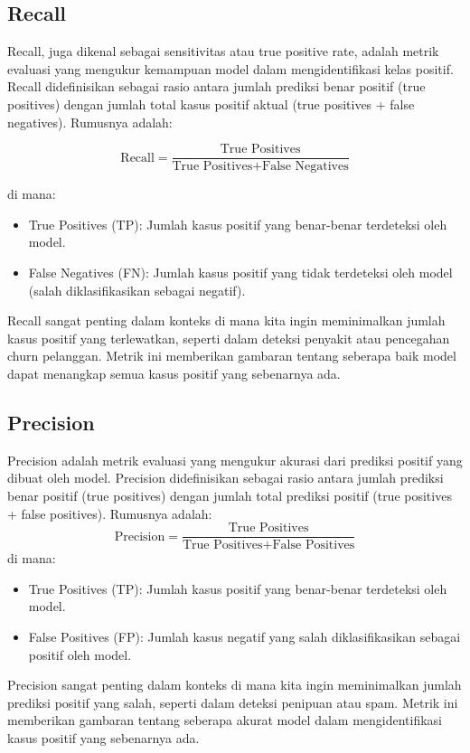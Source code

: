 \subsection{Recall}
Recall, juga dikenal sebagai sensitivitas atau true positive rate, adalah metrik evaluasi yang mengukur kemampuan model dalam mengidentifikasi kelas positif. Recall didefinisikan sebagai rasio antara jumlah prediksi benar positif (true positives) dengan jumlah total kasus positif aktual (true positives + false negatives). Rumusnya adalah:

\begin{equation}
    \text{Recall} = \frac{\text{True Positives}}{\text{True Positives} + \text{False Negatives}}
\end{equation}

di mana:
\begin{itemize}
    \item True Positives (TP): Jumlah kasus positif yang benar-benar terdeteksi oleh model.
    \item False Negatives (FN): Jumlah kasus positif yang tidak terdeteksi oleh model (salah diklasifikasikan sebagai negatif).
\end{itemize}

Recall sangat penting dalam konteks di mana kita ingin meminimalkan jumlah kasus positif yang terlewatkan, seperti dalam deteksi penyakit atau pencegahan churn pelanggan. Metrik ini memberikan gambaran tentang seberapa baik model dapat menangkap semua kasus positif yang sebenarnya ada.

\subsection{Precision}
Precision adalah metrik evaluasi yang mengukur akurasi dari prediksi positif yang dibuat oleh model. Precision didefinisikan sebagai rasio antara jumlah prediksi benar positif (true positives) dengan jumlah total prediksi positif (true positives + false positives). Rumusnya adalah:
\begin{equation}
    \text{Precision} = \frac{\text{True Positives}}{\text{True Positives} + \text{False Positives}}
\end{equation}
di mana:
\begin{itemize}
    \item True Positives (TP): Jumlah kasus positif yang benar-benar terdeteksi oleh model.
    \item False Positives (FP): Jumlah kasus negatif yang salah diklasifikasikan sebagai positif oleh model.
\end{itemize}
Precision sangat penting dalam konteks di mana kita ingin meminimalkan jumlah prediksi positif yang salah, seperti dalam deteksi penipuan atau spam. Metrik ini memberikan gambaran tentang seberapa akurat model dalam mengidentifikasi kasus positif yang sebenarnya ada.

